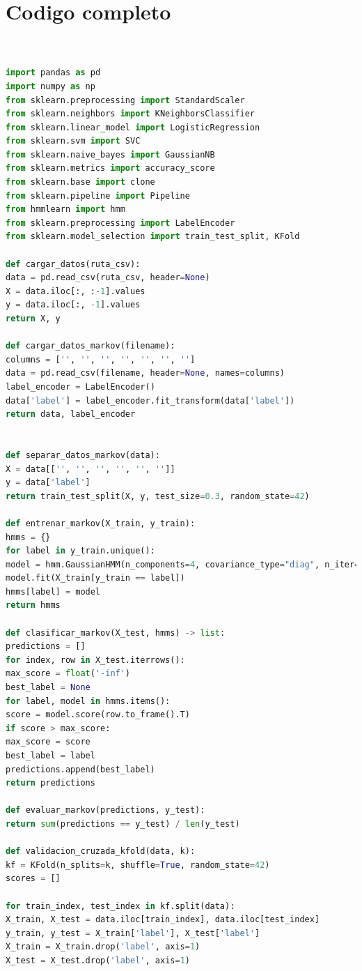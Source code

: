 \documentclass[12pt]{article}
\begin{document}
\section*{Codigo completo}
\begin{lstlisting}[language=Python]


import pandas as pd
import numpy as np
from sklearn.preprocessing import StandardScaler
from sklearn.neighbors import KNeighborsClassifier
from sklearn.linear_model import LogisticRegression
from sklearn.svm import SVC
from sklearn.naive_bayes import GaussianNB
from sklearn.metrics import accuracy_score
from sklearn.base import clone
from sklearn.pipeline import Pipeline
from hmmlearn import hmm
from sklearn.preprocessing import LabelEncoder
from sklearn.model_selection import train_test_split, KFold

def cargar_datos(ruta_csv):
data = pd.read_csv(ruta_csv, header=None)
X = data.iloc[:, :-1].values
y = data.iloc[:, -1].values
return X, y

def cargar_datos_markov(filename):
columns = ['', '', '', '', '', '', '']
data = pd.read_csv(filename, header=None, names=columns)
label_encoder = LabelEncoder()
data['label'] = label_encoder.fit_transform(data['label'])
return data, label_encoder


def separar_datos_markov(data):
X = data[['', '', '', '', '', '']]
y = data['label']
return train_test_split(X, y, test_size=0.3, random_state=42)

def entrenar_markov(X_train, y_train):
hmms = {}
for label in y_train.unique():
model = hmm.GaussianHMM(n_components=4, covariance_type="diag", n_iter=100)
model.fit(X_train[y_train == label])
hmms[label] = model
return hmms

def clasificar_markov(X_test, hmms) -> list:
predictions = []
for index, row in X_test.iterrows():
max_score = float('-inf')
best_label = None
for label, model in hmms.items():
score = model.score(row.to_frame().T)
if score > max_score:
max_score = score
best_label = label
predictions.append(best_label)
return predictions

def evaluar_markov(predictions, y_test):
return sum(predictions == y_test) / len(y_test)

def validacion_cruzada_kfold(data, k):
kf = KFold(n_splits=k, shuffle=True, random_state=42)
scores = []

for train_index, test_index in kf.split(data):
X_train, X_test = data.iloc[train_index], data.iloc[test_index]
y_train, y_test = X_train['label'], X_test['label']
X_train = X_train.drop('label', axis=1)
X_test = X_test.drop('label', axis=1)


\end{lstlisting}
\end{document}
